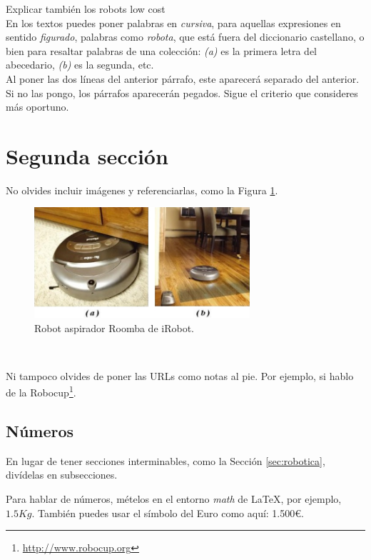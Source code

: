 Explicar también los robots low cost\\




En los textos puedes poner palabras en \textit{cursiva}, para aquellas expresiones en sentido \textit{figurado}, palabras como \textit{robota}, que está fuera del diccionario castellano, o bien para resaltar palabras de una colección: \textit{(a)} es la primera letra del abecedario, \textit{(b)} es la segunda, etc.\\

Al poner las dos líneas del anterior párrafo, este aparecerá separado del anterior. Si no las pongo, los párrafos aparecerán pegados. Sigue el criterio que consideres más oportuno.

\section{Segunda sección}
\label{sec:segundaseccion}

No olvides incluir imágenes y referenciarlas, como la Figura \ref{fig:roomba}.

\begin{figure} [h!]
  \begin{center}
    \includegraphics[width=8cm]{figs/roomba}
  \end{center}
  \caption{Robot aspirador Roomba de iRobot.}
  \label{fig:roomba}
\end{figure}\

Ni tampoco olvides de poner las URLs como notas al pie. Por ejemplo, si hablo de la Robocup\footnote{\url{http://www.robocup.org}}.

\subsection{Números}
\label{sec:subseccion}

En lugar de tener secciones interminables, como la Sección \ref{sec:robotica}, divídelas en subsecciones.

Para hablar de números, mételos en el entorno \textit{math} de \LaTeX, por ejemplo, $1.5Kg$. También puedes usar el símbolo del Euro como aquí: 1.500\euro.

